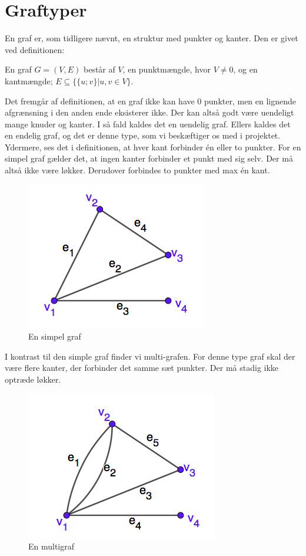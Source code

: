 \section{Graftyper}
En graf er, som tidligere nævnt, en struktur med punkter og kanter. Den er givet ved definitionen:
\begin{definition}
[Graf] 
En graf $G=(V,E)$ består af $V$, en punktmængde, hvor $V\neq0$, og en kantmængde; $E \subseteq \{\{u;v\}|u,v \in V\}$.
\end{definition}
Det fremgår af definitionen, at en graf ikke kan have 0 punkter, men en lignende afgrænsning i den anden ende eksisterer ikke. Der kan altså godt være uendeligt mange knuder og kanter. I så fald kaldes det en uendelig graf. Ellers kaldes det en endelig graf, og det er denne type, som vi beskæftiger os med i projektet.
Ydermere, ses det i definitionen, at hver kant forbinder én eller to punkter. For en simpel graf gælder det, at ingen kanter forbinder et punkt med sig selv. Der må altså ikke være løkker. Derudover forbindes to punkter med max én kant.
\begin{figure}[H]
\centering
\includegraphics[scale=0.5]{fig/img/simpel_graf.png}
\caption{En simpel graf}
\label{fig:simpel}
\end{figure}
I kontrast til den simple graf finder vi multi-grafen. For denne type graf skal der være flere kanter, der forbinder det samme sæt punkter. Der må stadig ikke optræde løkker.
\begin{figure}[H]
\centering
\includegraphics[scale=0.5]{fig/img/multigraf.png} 
\caption{En multigraf}
\label{fig:multi}
\end{figure}

